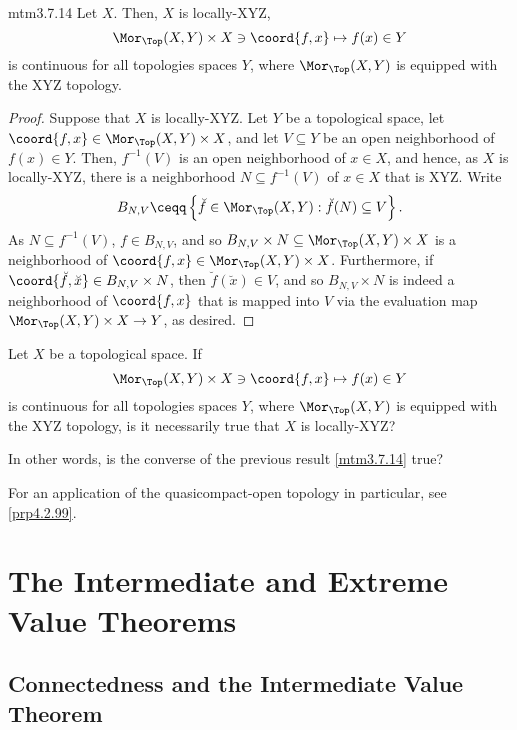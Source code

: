 \begin{mtm}{}{mtm3.7.14}
	Let $X$.  Then, $X$ is locally-XYZ,
	\begin{equation}
		\Mor _{\Top}(X,Y)\times X\ni \coord{f,x}\mapsto f(x)\in Y
	\end{equation}
	is continuous for all topologies spaces $Y$, where $\Mor _{\Top}(X,Y)$ is equipped with the XYZ topology.
	\begin{proof}
		Suppose that $X$ is locally-XYZ.  Let $Y$ be a topological space, let $\coord{f,x}\in \Mor _{\Top}(X,Y)\times X$, and let $V\subseteq Y$ be an open neighborhood of $f(x)\in Y$.  Then, $f^{-1}(V)$ is an open neighborhood of $x\in X$, and hence, as $X$ is locally-XYZ, there is a neighborhood $N\subseteq f^{-1}(V)$ of $x\in X$ that is XYZ.  Write
		\begin{equation}
			B_{N,V}\ceqq \left\{ \breve{f}\in \Mor _{\Top}(X,Y):\breve{f}(N)\subseteq V\right\} .
		\end{equation}
		As $N\subseteq f^{-1}(V)$, $f\in B_{N,V}$, and so $B_{N,V}\times N\subseteq \Mor _{\Top}(X,Y)\times X$ is a neighborhood of $\coord{f,x}\in \Mor _{\Top}(X,Y)\times X$.  Furthermore, if $\coord{\breve{f},\breve{x}}\in B_{N,V}\times N$, then $\breve{f}(\breve{x})\in V$, and so $B_{N,V}\times N$ is indeed a neighborhood of $\coord{f,x}$ that is mapped into $V$ via the evaluation map $\Mor _{\Top}(X,Y)\times X\rightarrow Y$, as desired.
	\end{proof}
\end{mtm}
\begin{exr}{}{}
	Let $X$ be a topological space.  If
	\begin{equation}
		\Mor _{\Top}(X,Y)\times X\ni \coord{f,x}\mapsto f(x)\in Y
	\end{equation}
	is continuous for all topologies spaces $Y$, where $\Mor _{\Top}(X,Y)$ is equipped with the XYZ topology, is it necessarily true that $X$ is locally-XYZ?
	\begin{rmk}
		In other words, is the converse of the previous result \cref{mtm3.7.14} true?
	\end{rmk}
\end{exr}
For an application of the quasicompact-open topology in particular, see \cref{prp4.2.99}.

\section{The Intermediate and Extreme Value Theorems}

\subsection{Connectedness and the Intermediate Value Theorem}

